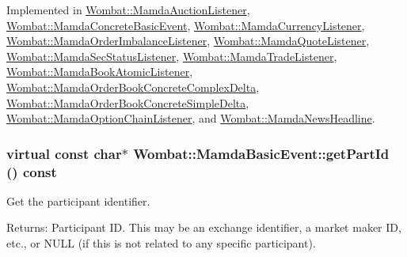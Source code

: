 Implemented in \hyperlink{classWombat_1_1MamdaAuctionListener_d8ba0fa1c6fc027fe676cd72ec17007a}{Wombat::Mamda\-Auction\-Listener}, \hyperlink{classWombat_1_1MamdaConcreteBasicEvent_1fb58780b5232b8a07cc86c745721257}{Wombat::Mamda\-Concrete\-Basic\-Event}, \hyperlink{classWombat_1_1MamdaCurrencyListener_80336ebcd54d9fdb027c620335529f1a}{Wombat::Mamda\-Currency\-Listener}, \hyperlink{classWombat_1_1MamdaOrderImbalanceListener_0598f54a0e0c05667551187418173c22}{Wombat::Mamda\-Order\-Imbalance\-Listener}, \hyperlink{classWombat_1_1MamdaQuoteListener_e5281f487264bda71fde9182921d6ae5}{Wombat::Mamda\-Quote\-Listener}, \hyperlink{classWombat_1_1MamdaSecStatusListener_a4642e50a6f7606ddf2eb510356468da}{Wombat::Mamda\-Sec\-Status\-Listener}, \hyperlink{classWombat_1_1MamdaTradeListener_ddcc8f4fae7a6d944ccc4021fd5ac492}{Wombat::Mamda\-Trade\-Listener}, \hyperlink{classWombat_1_1MamdaBookAtomicListener_6d0fa4b94f34bf538d1324ee65a08cdf}{Wombat::Mamda\-Book\-Atomic\-Listener}, \hyperlink{classWombat_1_1MamdaOrderBookConcreteComplexDelta_a7d88a2ded807a8f7a6f951cda7f0632}{Wombat::Mamda\-Order\-Book\-Concrete\-Complex\-Delta}, \hyperlink{classWombat_1_1MamdaOrderBookConcreteSimpleDelta_0bad5acee355acc180354fc1029ebca4}{Wombat::Mamda\-Order\-Book\-Concrete\-Simple\-Delta}, \hyperlink{classWombat_1_1MamdaOptionChainListener_7329d289f1c07002d10f50a04a1ea8fc}{Wombat::Mamda\-Option\-Chain\-Listener}, and \hyperlink{classWombat_1_1MamdaNewsHeadline_3eabde22221b2e826739c8c9a2f40b9f}{Wombat::Mamda\-News\-Headline}.\hypertarget{classWombat_1_1MamdaBasicEvent_94e531c6ae9ae7798725db14facbd6e2}{
\subsubsection[getPartId]{\setlength{\rightskip}{0pt plus 5cm}virtual const char$\ast$ Wombat::Mamda\-Basic\-Event::get\-Part\-Id () const}}
\label{classWombat_1_1MamdaBasicEvent_94e531c6ae9ae7798725db14facbd6e2}


Get the participant identifier. 

\begin{Desc}
\item[Returns:]Participant ID. This may be an exchange identifier, a market maker ID, etc., or NULL (if this is not related to any specific participant). \end{Desc}


